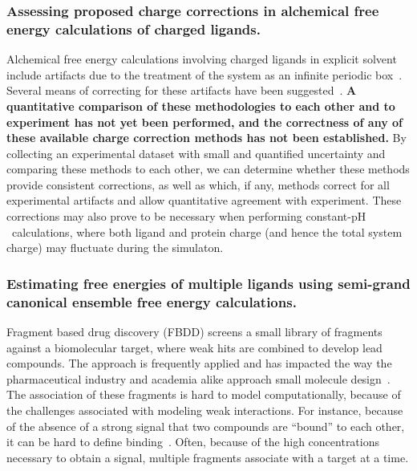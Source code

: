 \documentclass[10pt,final]{article}
\newcommand{\pH}{p$\mathrm{H}$\ }
\begin{document}
\subsubsection*{Assessing proposed charge corrections in alchemical free energy calculations of charged ligands.}
Alchemical free energy calculations involving charged ligands in explicit solvent include artifacts due to the treatment of the system as an infinite periodic box~\autocite{Rocklin2013b,Muddana2014a}. 
%
Several means of correcting for these artifacts have been suggested~\autocite{Reif2013a,Rocklin2013a,Lin2014a}.
%
\textbf{A quantitative comparison of these methodologies to each other and to experiment has not yet been performed, and the correctness of any of these available charge correction methods has not been established.}
%
By collecting an experimental dataset with small and quantified uncertainty and comparing these methods to each other, we can determine whether these methods provide consistent corrections, as well as which, if any, methods correct for all experimental artifacts and allow quantitative agreement with experiment.
%
These corrections may also prove to be necessary when performing constant-\pH calculations, where both ligand and protein charge (and hence the total system charge) may fluctuate during the simulaton.


 


\subsubsection*{Estimating free energies of multiple ligands using semi-grand canonical ensemble free energy calculations.}
Fragment based drug discovery (FBDD) screens a small library of fragments against a biomolecular target, where weak hits are combined to develop lead compounds.
%
The approach is frequently applied and has impacted the way the pharmaceutical industry and academia alike approach small molecule design~\autocite{Hajduk2007a}.
%
The association of these fragments is hard to model computationally, because of the challenges associated with modeling weak interactions.
%
For instance, because of the absence of a strong signal that two compounds are ``bound'' to each other, it can be hard to define binding~\autocite{Gilson1997a}.
%
Often, because of the high concentrations necessary to obtain a signal, multiple fragments associate with a target at a time.
\end{document}
